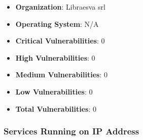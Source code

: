 \documentclass{article}
\begin{document}
\begin{itemize}
    \item \textbf{Organization}: Libraesva srl
    \item \textbf{Operating System}:  N/A 
    \item \textbf{Critical Vulnerabilities}: 0
    \item \textbf{High Vulnerabilities}: 0
    \item \textbf{Medium Vulnerabilities}: 0
    \item \textbf{Low Vulnerabilities}: 0
    \item \textbf{Total Vulnerabilities}: 0
\end{itemize}

\subsubsection*{Services Running on IP Address}
\end{document}
